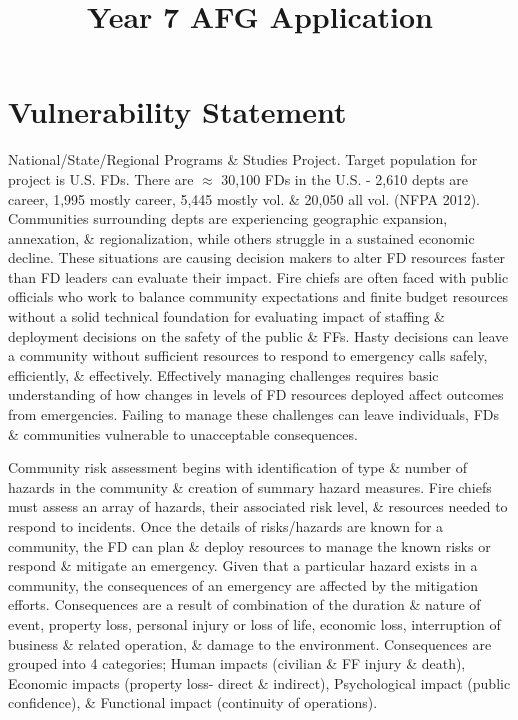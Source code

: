 \documentclass[12pt,letterpaper]{article}
\title{Year 7 AFG Application}
\begin{document}
\maketitle

\section{Vulnerability Statement}
\label{sec:vuln}

National/State/Regional Programs \& Studies Project. Target population for project is U.S. FDs. There are $\approx$ 30,100 FDs in the U.S. - 2,610 depts are career, 1,995 mostly career, 5,445 mostly vol. \& 20,050 all vol. (NFPA 2012). Communities surrounding depts are experiencing geographic expansion, annexation, \& regionalization, while others struggle in a sustained economic decline. These situations are causing decision makers to alter FD resources faster than FD leaders can evaluate their impact. Fire chiefs are often faced with public officials who work to balance community expectations and finite budget resources without a solid technical foundation for evaluating impact of staffing \& deployment decisions on the safety of the public \& FFs. Hasty decisions can leave a community without sufficient resources to respond to emergency calls safely, efficiently, \& effectively. Effectively managing challenges requires basic understanding of how changes in levels of FD resources deployed affect outcomes from emergencies. Failing to manage these challenges can leave individuals, FDs \& communities vulnerable to unacceptable consequences. 

Community risk assessment begins with identification of type \& number of hazards in the community \& creation of summary hazard measures. Fire chiefs must assess an array of hazards, their associated risk level, \& resources needed to respond to incidents. Once the details of risks/hazards are known for a community, the FD can plan \& deploy resources to manage the known risks or respond \& mitigate an emergency. Given that a particular hazard exists in a community, the consequences of an emergency are affected by the mitigation efforts. Consequences are a result of combination of the duration \& nature of event, property loss, personal injury or loss of life, economic loss, interruption of business \& related operation, \& damage to the environment. Consequences are grouped into 4 categories; Human impacts (civilian \& FF injury \& death), Economic impacts (property loss- direct \& indirect), Psychological impact (public confidence), \& Functional impact (continuity of operations). 
\end{document}
